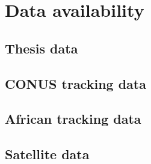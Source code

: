 \chapter{Data availability}

\section{Thesis data}

\section{CONUS tracking data}

\section{African tracking data}

\section{Satellite data}

